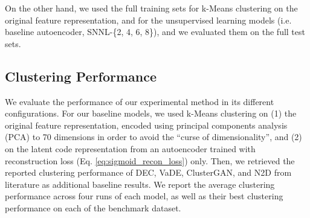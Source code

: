 \documentclass[conference]{IEEEtran}
\begin{document}
On the other hand, we used the full training sets for k-Means clustering on the original feature representation, and for the unsupervised learning models (i.e. baseline autoencoder, SNNL-\{2, 4, 6, 8\}), and we evaluated them on the full test sets.

\subsection{Clustering Performance}\label{section:clustering_performance}
We evaluate the performance of our experimental method in its different configurations. For our baseline models, we used k-Means clustering on (1) the original feature representation, encoded using principal components analysis (PCA) to 70 dimensions in order to avoid the ``curse of dimensionality''\cite{bellman1961adaptive}, and (2) on the latent code representation from an autoencoder trained with reconstruction loss (Eq. \ref{eq:sigmoid_recon_loss}) only. Then, we retrieved the reported clustering performance of DEC\cite{xie2016unsupervised}, VaDE\cite{jiang2016variational}, ClusterGAN\cite{mukherjee2019clustergan}, and N2D\cite{mcconville2019n2d} from literature as additional baseline results. We report the average clustering performance across four runs of each model, as well as their best clustering performance on each of the benchmark dataset.
\end{document}
